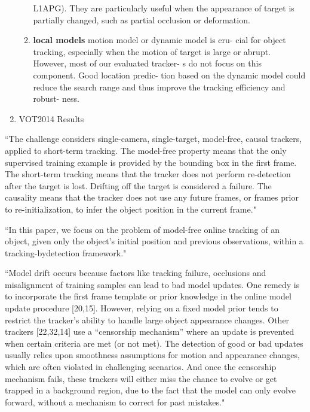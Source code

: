 \begin{enumerate}
\begin{enumerate}
    L1APG). They are particularly useful when the appearance
    of target is partially changed, such as partial occlusion or
    deformation.
    \item \textbf{local models} motion model or dynamic model is cru-
    cial for object tracking, especially when the motion of target
    is large or abrupt. However, most of our evaluated tracker-
    s do not focus on this component. Good location predic-
    tion based on the dynamic model could reduce the search
    range and thus improve the tracking efficiency and robust-
    ness.
    \end{enumerate}
\item VOT2014 Results \cite{kristan2014visual}
\end{enumerate}

``The challenge considers single-camera, single-target, model-free, causal trackers, applied to short-term tracking. The model-free property means that the only supervised training example is provided by the bounding box in the first frame.  The short-term tracking means that the tracker does not perform re-detection after the target is lost. Drifting off the target is considered a failure. The causality means that the tracker does not use any future frames, or frames prior to re-initialization, to infer the object position in the current frame." \cite{kristan2014visual}

``In this paper, we focus on the problem of model-free online tracking of an object,
given only the object’s initial position and previous observations, within a tracking-bydetection
framework."\cite{zhang2014meem}

``Model drift occurs because factors like tracking failure, occlusions and misalignment
of training samples can lead to bad model updates. One remedy is to incorporate the first
frame template or prior knowledge in the online model update procedure [20,15]. However,
relying on a fixed model prior tends to restrict the tracker’s ability to handle large
object appearance changes. Other trackers [22,32,14] use a “censorship mechanism”
where an update is prevented when certain criteria are met (or not met). The detection
of good or bad updates usually relies upon smoothness assumptions for motion and
appearance changes, which are often violated in challenging scenarios. And once the
censorship mechanism fails, these trackers will either miss the chance to evolve or get
trapped in a background region, due to the fact that the model can only evolve forward,
without a mechanism to correct for past mistakes."\cite{zhang2014meem}

